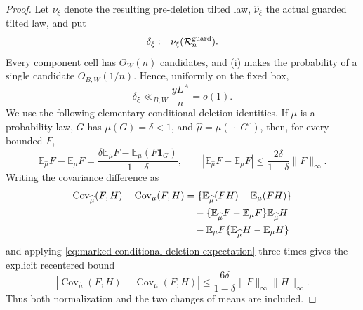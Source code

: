 \documentclass[11pt]{article}
\numberwithin{equation}{section}
\theoremstyle{definition}
\theoremstyle{remark}
\newcommand{\1}{\mathbf 1}
\begin{document}
\begin{proof}
Let \(\nu_\xi\) denote the resulting pre-deletion tilted law,
\(\widehat\nu_\xi\) the actual guarded tilted law, and put
\[
\delta_\xi:=\nu_\xi(\mathcal R_n^{\rm guard}).
\]
Every component cell has \(\Theta_W(n)\) candidates, and (i) makes the
probability of a single candidate \(O_{B,W}(1/n)\).  Hence, uniformly on
the fixed box,
\begin{equation}
 \delta_\xi\ll_{B,W}\frac{yL^A}{n}=o(1).
 \label{eq:marked-guard-deleted-mass}
\end{equation}
We use the following elementary conditional-deletion identities.  If
\(\mu\) is a probability law, \(G\) has \(\mu(G)=\delta<1\), and
\(\widehat\mu=\mu(\,\cdot\mid G^c)\), then, for every bounded \(F\),
\begin{equation}
 \mathbb E_{\widehat\mu}F-\mathbb E_\mu F
 =\frac{\delta\mathbb E_\mu F-\mathbb E_\mu(F\1_G)}{1-\delta},
 \qquad
 \left|\mathbb E_{\widehat\mu}F-\mathbb E_\mu F\right|
 \leq\frac{2\delta}{1-\delta}\|F\|_\infty.
 \label{eq:marked-conditional-deletion-expectation}
\end{equation}
Writing the covariance difference as
\begin{align*}
 \operatorname{Cov}_{\widehat\mu}(F,H)-\operatorname{Cov}_\mu(F,H)
 &=\{\mathbb E_{\widehat\mu}(FH)-\mathbb E_\mu(FH)\}\notag\\
 &\quad-\{\mathbb E_{\widehat\mu}F-\mathbb E_\mu F\}
       \mathbb E_{\widehat\mu}H\notag\\
 &\quad-\mathbb E_\mu F
       \{\mathbb E_{\widehat\mu}H-\mathbb E_\mu H\}
\end{align*}
and applying \eqref{eq:marked-conditional-deletion-expectation} three
times gives the explicit recentered bound
\begin{equation}
 \left|\operatorname{Cov}_{\widehat\mu}(F,H)
       -\operatorname{Cov}_\mu(F,H)\right|
 \leq\frac{6\delta}{1-\delta}\|F\|_\infty\|H\|_\infty.
 \label{eq:marked-conditional-deletion-covariance}
\end{equation}
Thus both normalization and the two changes of means are included.


\end{proof}
\end{document}
